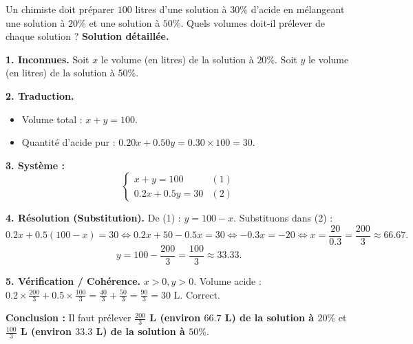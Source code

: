 \documentclass[11pt]{article}
\begin{document}
\begin{exoresolu}
Un chimiste doit préparer $\num{100}$ litres d'une solution à $\num{30}\%$ d'acide en mélangeant une solution à $\num{20}\%$ et une solution à $\num{50}\%$.
Quels volumes doit-il prélever de chaque solution ?
\tcblower
\textbf{Solution détaillée.}

\noindent\textbf{1. Inconnues.}
Soit $x$ le volume (en litres) de la solution à $\num{20}\%$.
Soit $y$ le volume (en litres) de la solution à $\num{50}\%$.

\noindent\textbf{2. Traduction.}
\begin{itemize}
\item Volume total : $x + y = 100$.
\item Quantité d'acide pur : $\num{0,20}x + \num{0,50}y = \num{0,30} \times 100 = 30$.
\end{itemize}

\noindent\textbf{3. Système :}
\[
\begin{cases}
x + y = 100 & (1) \\
\num{0,2}x + \num{0,5}y = 30 & (2)
\end{cases}
\]

\noindent\textbf{4. Résolution (Substitution).}
De (1) : $y = 100 - x$.
Substituons dans (2) :
\[
\num{0,2}x + \num{0,5}(100 - x) = 30 \iff \num{0,2}x + 50 - \num{0,5}x = 30 \iff -\num{0,3}x = -20 \iff x = \frac{20}{\num{0,3}} = \frac{200}{3} \approx \num{66,67}.
\]
\[
y = 100 - \frac{200}{3} = \frac{100}{3} \approx \num{33,33}.
\]

\noindent\textbf{5. Vérification / Cohérence.}
$x>0, y>0$. Volume acide : $\num{0,2}\times\frac{200}{3} + \num{0,5}\times\frac{100}{3} = \frac{40}{3} + \frac{50}{3} = \frac{90}{3} = 30$ L. Correct.

\noindent\textbf{Conclusion :} Il faut prélever \textbf{$\frac{200}{3}$ L (environ $\num{66,7}$ L) de la solution à $\num{20}\%$} et \textbf{$\frac{100}{3}$ L (environ $\num{33,3}$ L) de la solution à $\num{50}\%$}.
\end{exoresolu}
\end{document}
